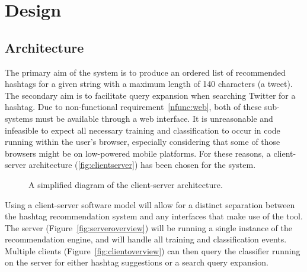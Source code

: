\documentclass[11pt,a4paper]{report}
\begin{document}
\pagebreak

\chapter{Design}
\label{chap:design}

\section{Architecture}

The primary aim of the system is to produce an ordered list of recommended hashtags for a given string with a maximum length of 140 characters (a tweet). The secondary aim is to facilitate query expansion when searching Twitter for a hashtag. Due to non-functional requirement~\ref{nfunc:web}, both of these sub-systems must be available through a web interface. It is unreasonable and infeasible to expect all necessary training and classification to occur in code running within the user's browser, especially considering that some of those browsers might be on low-powered mobile platforms. For these reasons, a client-server architecture (\autoref{fig:clientserver}) has been chosen for the system.

\begin{figure}[htpb]
    \centering
    \caption{A simplified diagram of the client-server architecture.}
    \label{fig:clientserver}
\end{figure}

Using a client-server software model will allow for a distinct separation between the hashtag recommendation system and any interfaces that make use of the tool. The server (Figure~\ref{fig:serveroverview}) will be running a single instance of the recommendation engine, and will handle all training and classification events. Multiple clients (Figure~\ref{fig:clientoverview}) can then query the classifier running on the server for either hashtag suggestions or a search query expansion.
\end{document}
